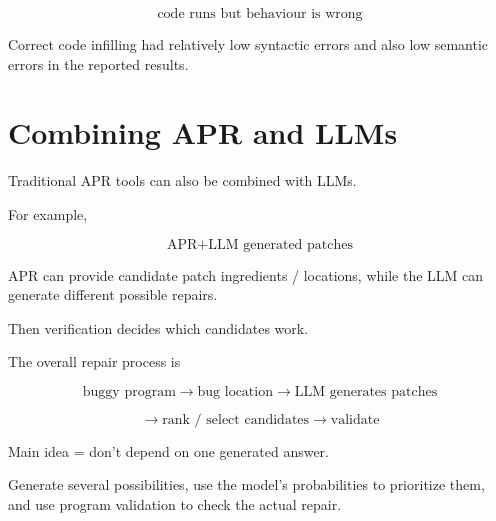 \documentclass[11pt]{book}
\begin{document}
\[
\text{code runs but behaviour is wrong}
\]

Correct code infilling had relatively low syntactic
errors and also low semantic errors in the reported
results.

\section{Combining APR and LLMs}

Traditional APR tools can also be combined with LLMs.

For example,

\[
\text{APR}
+
\text{LLM generated patches}
\]

APR can provide candidate patch ingredients /
locations, while the LLM can generate different
possible repairs.

Then verification decides which candidates work.

\begin{ppkey}
The overall repair process is

\[
\text{buggy program}
\rightarrow
\text{bug location}
\rightarrow
\text{LLM generates patches}
\]

\[
\rightarrow
\text{rank / select candidates}
\rightarrow
\text{validate}
\]
\end{ppkey}

Main idea = don't depend on one generated answer.

Generate several possibilities, use the model's
probabilities to prioritize them, and use program
validation to check the actual repair.
\end{document}
